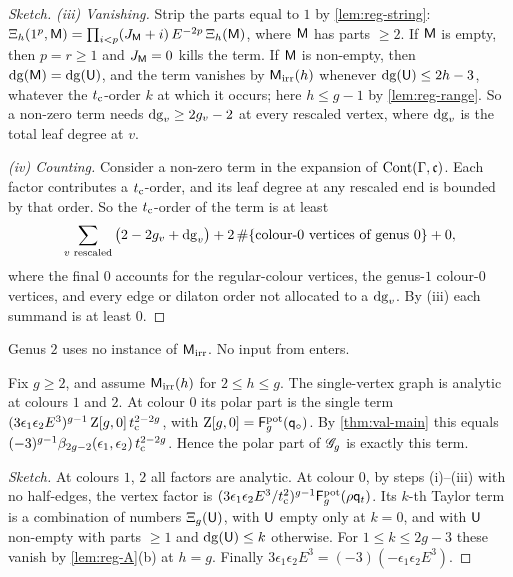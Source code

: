 \begin{proof}[Sketch]
\emph{(iii) Vanishing.} Strip the parts equal to $1$ by \cref{lem:reg-string}: $\Xi_h(1^p,\mathsf{M})=\prod_{i<p}(J_{\mathsf{M}}+i)\,E^{-2p}\,\Xi_h(\mathsf{M})$, where $\mathsf{M}$ has parts $\geq 2$. If $\mathsf{M}$ is empty, then $p=r\geq 1$ and $J_{\mathsf{M}}=0$ kills the term. If $\mathsf{M}$ is non-empty, then $\mathrm{dg}(\mathsf{M})=\mathrm{dg}(\mathsf{U})$, and the term vanishes by $\mathsf{M}_{\mathrm{irr}}(h)$ whenever $\mathrm{dg}(\mathsf{U})\leq 2h-3$, whatever the $t_{\mathrm{c}}$-order $k$ at which it occurs; here $h\leq g-1$ by \cref{lem:reg-range}. So a non-zero term needs $\mathrm{dg}_{v}\geq 2g_{v}-2$ at every rescaled vertex, where $\mathrm{dg}_{v}$ is the total leaf degree at $v$.

\emph{(iv) Counting.} Consider a non-zero term in the expansion of $\mathrm{Cont}(\Gamma,\mathfrak{c})$. Each factor contributes a $t_{\mathrm{c}}$-order, and its leaf degree at any rescaled end is bounded by that order. So the $t_{\mathrm{c}}$-order of the term is at least
\[
\sum_{v\text{ rescaled}}\big(2-2g_{v}+\mathrm{dg}_{v}\big)+2\,\#\{\text{colour-$0$ vertices of genus $0$}\}+0,
\]
where the final $0$ accounts for the regular-colour vertices, the genus-$1$ colour-$0$ vertices, and every edge or dilaton order not allocated to a $\mathrm{dg}_{v}$. By \textup{(iii)} each summand is at least $0$.
\end{proof}

Genus $2$ uses no instance of $\mathsf{M}_{\mathrm{irr}}$. No input from \cite{BS} enters.

\begin{cor}
\label{cor:reg-sv}
Fix $g\geq 2$, and assume $\mathsf{M}_{\mathrm{irr}}(h)$ for $2\leq h\leq g$. The single-vertex graph is analytic at colours $1$ and $2$. At colour $0$ its polar part is the single term $(3\epsilon_1\epsilon_2E^3)^{g-1}\,\mathrm{Z}[g,0]\,t_{\mathrm{c}}^{2-2g}$, with $\mathrm{Z}[g,0]=\mathsf{F}^{\mathrm{pot}}_g(\mathsf{q}_{\circ})$. By \cref{thm:val-main} this equals $(-3)^{g-1}\beta_{2g-2}(\epsilon_1,\epsilon_2)\,t_{\mathrm{c}}^{2-2g}$. Hence the polar part of $\mathscr{G}_g$ is exactly this term.
\end{cor}

\begin{proof}[Sketch]
At colours $1$, $2$ all factors are analytic. At colour $0$, by steps \textup{(i)--(iii)} with no half-edges, the vertex factor is $(3\epsilon_1\epsilon_2E^3/t_{\mathrm{c}}^2)^{g-1}\mathsf{F}^{\mathrm{pot}}_g(\rho\mathsf{q}_{t})$. Its $k$-th Taylor term is a combination of numbers $\Xi_g(\mathsf{U})$, with $\mathsf{U}$ empty only at $k=0$, and with $\mathsf{U}$ non-empty with parts $\geq 1$ and $\mathrm{dg}(\mathsf{U})\leq k$ otherwise. For $1\leq k\leq 2g-3$ these vanish by \cref{lem:reg-A}\textup{(b)} at $h=g$. Finally $3\epsilon_1\epsilon_2E^3=(-3)(-\epsilon_1\epsilon_2E^3)$.
\end{proof}

